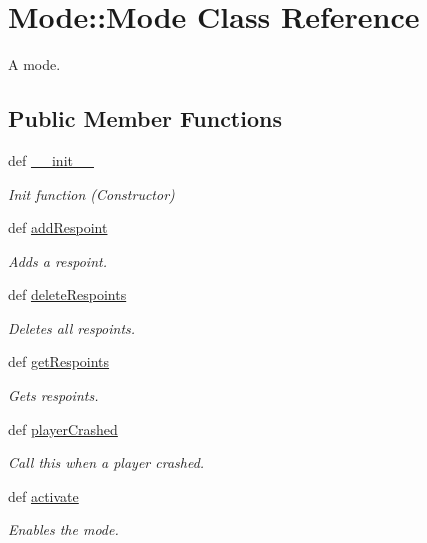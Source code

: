 \hypertarget{class_mode_1_1_mode}{
\section{\-Mode\-:\-:\-Mode \-Class \-Reference}
\label{class_mode_1_1_mode}
}


\-A mode.  


\subsection*{\-Public \-Member \-Functions}
\begin{DoxyCompactItemize}
\item 
def \hyperlink{class_mode_1_1_mode_af63425c9bf9d27b919c571dc46115d7a}{\-\_\-\-\_\-init\-\_\-\-\_\-}
\begin{DoxyCompactList}\small\item\em \-Init function (\-Constructor) \end{DoxyCompactList}\item 
def \hyperlink{class_mode_1_1_mode_aa4f6ada647c8a93f50790496f30facfe}{add\-Respoint}
\begin{DoxyCompactList}\small\item\em \-Adds a respoint. \end{DoxyCompactList}\item 
def \hyperlink{class_mode_1_1_mode_a108ece2f9375bb543358c812303ba4cb}{delete\-Respoints}
\begin{DoxyCompactList}\small\item\em \-Deletes all respoints. \end{DoxyCompactList}\item 
def \hyperlink{class_mode_1_1_mode_a2d2553d4d60379b68ce26f94c4b30d80}{get\-Respoints}
\begin{DoxyCompactList}\small\item\em \-Gets respoints. \end{DoxyCompactList}\item 
def \hyperlink{class_mode_1_1_mode_a6a907be956039209b6c0255fdc5080cc}{player\-Crashed}
\begin{DoxyCompactList}\small\item\em \-Call this when a player crashed. \end{DoxyCompactList}\item 
def \hyperlink{class_mode_1_1_mode_afec4fc9e37bc06610ad31fe474ad446f}{activate}
\begin{DoxyCompactList}\small\item\em \-Enables the mode. \end{DoxyCompactList}\item 

\end{DoxyCompactItemize}
